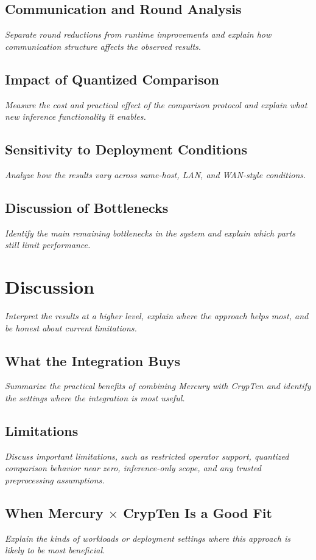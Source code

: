 \subsection{Communication and Round Analysis}
\textit{Separate round reductions from runtime improvements and explain how communication structure affects the observed results.}

\subsection{Impact of Quantized Comparison}
\textit{Measure the cost and practical effect of the comparison protocol and explain what new inference functionality it enables.}

\subsection{Sensitivity to Deployment Conditions}
\textit{Analyze how the results vary across same-host, LAN, and WAN-style conditions.}

\subsection{Discussion of Bottlenecks}
\textit{Identify the main remaining bottlenecks in the system and explain which parts still limit performance.}

\section{Discussion}
\textit{Interpret the results at a higher level, explain where the approach helps most, and be honest about current limitations.}

\subsection{What the Integration Buys}
\textit{Summarize the practical benefits of combining Mercury with CrypTen and identify the settings where the integration is most useful.}

\subsection{Limitations}
\textit{Discuss important limitations, such as restricted operator support, quantized comparison behavior near zero, inference-only scope, and any trusted preprocessing assumptions.}

\subsection{When Mercury \texorpdfstring{$\times$}{x} CrypTen Is a Good Fit}
\textit{Explain the kinds of workloads or deployment settings where this approach is likely to be most beneficial.}

